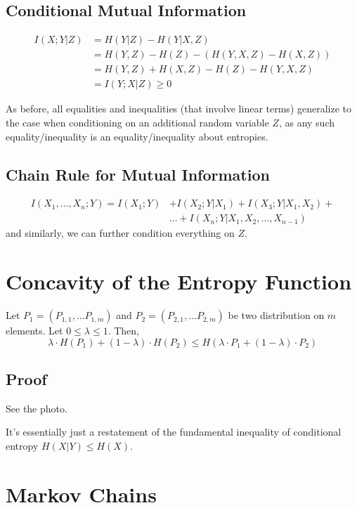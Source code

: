 \documentclass{article}
\begin{document}
\subsection{Conditional Mutual Information}

\begin{align*}
    I(X;Y|Z) &= H(Y|Z) - H(Y|X,Z)\\
    &= H(Y,Z) - H(Z)- \left(H(Y,X,Z) - H(X,Z)\right)\\
    &= H(Y,Z) + H(X,Z) - H(Z) - H(Y,X,Z)\\
    &= I(Y;X|Z)\geq 0
\end{align*}

As before, all equalities and inequalities (that involve linear terms) generalize to the case when conditioning on an additional random variable $Z$, as any such equality/inequality is an equality/inequality about entropies.

\subsection{Chain Rule for Mutual Information}

\begin{align*}
    I(X_1,\ldots,X_n;Y) = I(X_1;Y) &+ I(X_2;Y|X_1) + I(X_3;Y|X_1,X_2)+\\
    &\ldots + I(X_n;Y|X_1,X_2,\ldots, X_{n-1})
\end{align*}
and similarly, we can further condition everything on $Z$.

\section{Concavity of the Entropy Function}

Let $P_1=(P_{1,1},\ldots P_{1,m})$ and $P_2=(P_{2,1},\ldots P_{2,m})$ be two distribution on $m$ elements. Let $0\leq \lambda \leq 1$. Then,
\[
\lambda\cdot H(P_1) + (1-\lambda) \cdot H(P_2)\leq H(\lambda \cdot P_1 + (1-\lambda)\cdot P_2)
\]

\subsection{Proof}

See the photo.

It's essentially just a restatement of the fundamental inequality of conditional entropy $H(X|Y)\leq H(X)$.

\section{Markov Chains}
\end{document}

